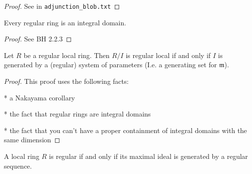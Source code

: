 \begin{comment}
\begin{definition}
  \label{def:reg_ring}
  \uses{def:reg_loc}
  A ring $R$ is regular if 
  $R_{\mathfrak{p}}$ is regular
  for every $\mathfrak{p} \in R$.
\end{definition}

\begin{proposition}
  \label{prop:reg_def_equiv}
  \uses{def:reg_loc}
  The following are equivalent
  Firstly, $R$ is regular.
  Secondly, the zariski cotangent space
  is a vector space of dimension $\dim R$.
\end{proposition}
\end{comment}

\begin{proof}
  See in \verb|adjunction_blob.txt|
\end{proof}

\begin{lemma}
  \label{lem:reg_int_dom}
  Every regular ring is an integral domain.
\end{lemma}

\begin{proof}

  See BH 2.2.3

\end{proof}

\begin{proposition}[BH 2.2.4]
  \label{prop:reg_quot_sys_param}
  Let $R$ be a regular local ring. 
  Then $R / I$ is regular local if and only if 
  $I$ is generated by a (regular) system of parameters
  (I.e. a generating set for $\mathfrak{m}$).
\end{proposition}

\begin{proof}
  This proof uses the following facts:

  * a Nakayama corollary
  
  * the fact that regular rings are integral domains

  * the fact that you can't have a proper containment
    of integral domains with the same dimension
\end{proof}

\begin{proposition}
  \label{prop:reg_loc_maximal_reg_seq}
  A local ring $R$ is regular if and only if
  its maximal ideal is generated by a regular sequence.
\end{proposition}

